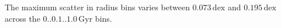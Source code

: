 The maximum scatter in radius bins varies between $0.073\,\mathrm{dex}$ and $0.195\,\mathrm{dex}$ across the $0..0.1..1.0\,\mathrm{Gyr}$ bins.%

